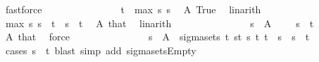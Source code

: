 \begin{isabellebody}
\ fastforce\isanewline
\ \ \ \ \ \ \ \ \ \ \ \ \isamarkupfalse%
\ \isamarkupfalse%
\ {\isachardoublequoteopen}t\ {\isasymle}\ max\ s\ s{\isacharprime}{\kern0pt}{\isachardoublequoteclose}\ \isamarkupfalse%
\ A\ True\ \isamarkupfalse%
\ linarith\isanewline
\ \ \ \ \ \ \ \ \ \ \ \ \isamarkupfalse%
\ \isamarkupfalse%
\ {\isachardoublequoteopen}max\ s\ s{\isacharprime}{\kern0pt}\ {\isacharless}{\kern0pt}\ t{\isacharprime}{\kern0pt}{\isachardoublequoteclose}\ \ {\isachardoublequoteopen}s\ {\isacharless}{\kern0pt}\ t{\isacharprime}{\kern0pt}{\isachardoublequoteclose}\ \isamarkupfalse%
\ A\ that\ \isamarkupfalse%
\ linarith\isanewline
\ \ \ \ \ \ \ \ \ \ \ \ \isamarkupfalse%
\ \isamarkupfalse%
\ {\isachardoublequoteopen}{\isacharbraceleft}{\kern0pt}s{\isacharless}{\kern0pt}{\isachardot}{\kern0pt}{\isachardot}{\kern0pt}{\isacharbraceright}{\kern0pt}\ {\isasyminter}\ A\ {\isacharequal}{\kern0pt}\ {\isacharbraceleft}{\kern0pt}{\isacharbraceright}{\kern0pt}{\isachardoublequoteclose}\ \ {\isachardoublequoteopen}{\isasymnot}\ s\ {\isacharless}{\kern0pt}\ t{\isacharprime}{\kern0pt}{\isachardoublequoteclose}\ \isamarkupfalse%
\ A\ that\ \isamarkupfalse%
\ force\isanewline
\ \ \ \ \ \ \ \ \ \ \ \ \isamarkupfalse%
\ \isamarkupfalse%
\ {\isachardoublequoteopen}{\isacharbraceleft}{\kern0pt}s{\isacharless}{\kern0pt}{\isachardot}{\kern0pt}{\isachardot}{\kern0pt}{\isacharbraceright}{\kern0pt}\ {\isasyminter}\ A\ {\isasymin}\ sigma{\isacharunderscore}{\kern0pt}sets\ {\isacharbraceleft}{\kern0pt}t\ {\isacharbraceleft}{\kern0pt}{\isacharbraceleft}{\kern0pt}s{\isacharless}{\kern0pt}{\isachardot}{\kern0pt}{\isachardot}{\kern0pt}t{\isacharbraceright}{\kern0pt}\ {\isacharbar}{\kern0pt}s\ t{\isachardot}{\kern0pt}\ t\ {\isasymle}\ s\ {\isasymand}\ s\ {\isacharless}{\kern0pt}\ t{\isacharbraceright}{\kern0pt}{\isachardoublequoteclose}\ \isamarkupfalse%
\ {\isacharparenleft}{\kern0pt}cases\ {\isachardoublequoteopen}s\ {\isacharless}{\kern0pt}\ t{\isacharprime}{\kern0pt}{\isachardoublequoteclose}{\isacharparenright}{\kern0pt}\ {\isacharparenleft}{\kern0pt}blast{\isacharcomma}{\kern0pt}\ simp\ add{\isacharcolon}{\kern0pt}\ sigma{\isacharunderscore}{\kern0pt}sets{\isachardot}{\kern0pt}Empty{\isacharparenright}{\kern0pt}\isanewline

\end{isabellebody}
